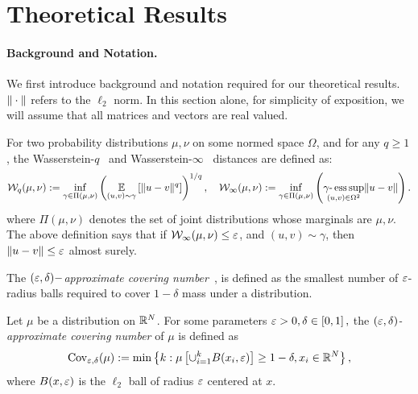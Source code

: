 \section{Theoretical Results}\label{sec:theory}
\paragraph{Background and Notation.}
We first introduce background and notation required for our theoretical results. $\|\cdot\|$ refers to the $\ell_2$ norm. In this section alone, for simplicity of exposition, we will assume that all matrices and vectors are real valued.  

For two probability distributions $\mu, \nu$ on some normed space $\Omega$, and for any $q\geq 1$, the Wasserstein-$q$~\cite{villani2008optimal, arjovsky2017wasserstein} and Wasserstein-$\infty$~\cite{champion2008wasserstein} distances are defined as:
\begin{align*}
  \mathcal W_q ( \mu, \nu) := \inf_{\gamma \in \Pi(\mu,\nu)} \left( \operatorname*{\mathbb{E}}_{(u,v)
  \sim \gamma} \left[ \| u - v\|^q \right] \right)^{1/q}, \quad
  \mathcal W_{\infty}(\mu,\nu) := \inf_{\gamma \in \Pi(\mu,\nu)} \left(
    \underset{{(u,v) \in \Omega^2}}{\gamma\text{-}\operatorname{ess\,sup}} \|u - v\|
\right).
\end{align*}
where $\Pi(\mu,\nu)$ denotes the set of joint distributions whose
marginals are $\mu,\nu$.
The above definition says that if $\mathcal W_{\infty}(\mu,\nu)\leq \varepsilon$,
and $(u,v) \sim \gamma$, then $\|u-v\| \leq \varepsilon$ almost surely.

The $(\varepsilon, \delta)-$\emph{approximate
covering number}~\cite{jalal2021instance}, is defined as the smallest
number of $\varepsilon$-radius balls required to cover $1-\delta$ mass under
a distribution.  
\begin{definition}
  Let $\mu$ be a distribution on $\mathbb{R}^N$. For some parameters
  $\varepsilon > 0,
  \delta\in \left[ 0,1 \right],$ the \emph{$(\varepsilon,\delta)$-approximate
  covering number} of $\mu$ is defined as
  \[
    \operatorname{Cov}_{\varepsilon,\delta}(\mu) := \min\left\{ k :  \mu\left[ \cup_{i=1}^k
    B(x_i,\varepsilon)  \right]\geq 1 - \delta, x_i \in \mathbb{R}^N  \right\},
  \]
  where $B(x, \varepsilon)$ is the $\ell_2$ ball of radius $\varepsilon$ centered
  at $x$.
\end{definition}\label{defn: cov}

